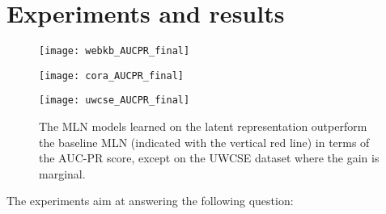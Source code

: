





\section{Experiments and results}

\begin{figure*}
    \begin{minipage}[thb]{.33\linewidth}
        \centering
        \texttt{[image: webkb\_AUCPR\_final]}
    \end{minipage}
    \begin{minipage}[htb]{.33\linewidth}
        \centering
        \texttt{[image: cora\_AUCPR\_final]}
    \end{minipage}
    \begin{minipage}[htb]{.33\linewidth}
        \centering
        \texttt{[image: uwcse\_AUCPR\_final]}
    \end{minipage}
    \caption{The MLN models learned on the latent representation outperform the baseline MLN (indicated with the vertical red line) in terms of the AUC-PR score, except on the UWCSE dataset where the gain is marginal.}
    \label{fig:resultsAUCPR}
\end{figure*}

The experiments aim at answering the following question:


